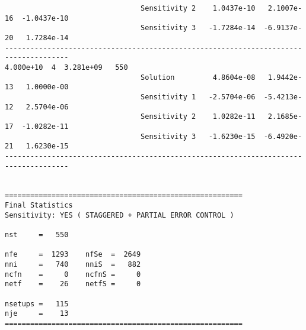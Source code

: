 \begin{verbatim}
                                Sensitivity 2    1.0437e-10   2.1007e-16  -1.0437e-10 
                                Sensitivity 3   -1.7284e-14  -6.9137e-20   1.7284e-14 
-------------------------------------------------------------------------------------
4.000e+10  4  3.281e+09   550
                                Solution         4.8604e-08   1.9442e-13   1.0000e-00 
                                Sensitivity 1   -2.5704e-06  -5.4213e-12   2.5704e-06 
                                Sensitivity 2    1.0282e-11   2.1685e-17  -1.0282e-11 
                                Sensitivity 3   -1.6230e-15  -6.4920e-21   1.6230e-15 
-------------------------------------------------------------------------------------


========================================================
Final Statistics
Sensitivity: YES ( STAGGERED + PARTIAL ERROR CONTROL )

nst     =   550                

nfe     =  1293    nfSe  =  2649  
nni     =   740    nniS  =   882  
ncfn    =     0    ncfnS =     0  
netf    =    26    netfS =     0

nsetups =   115                  
nje     =    13                  
========================================================
\end{verbatim}